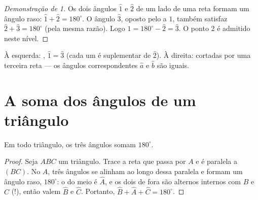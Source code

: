 \begin{proof}[Demonstração de 1]
Os dois ângulos $\widehat{1}$ e $\widehat{2}$ de um lado de uma reta
formam um ângulo raso: $\widehat 1 + \widehat 2 = 180^\circ$. O ângulo
$\widehat 3$, oposto pelo  a $\widehat 1$, também satisfaz
$\widehat 2 + \widehat 3 = 180^\circ$ (pela mesma razão). Logo
$\widehat 1 = 180^\circ - \widehat 2 = \widehat 3$. O ponto 2 é
admitido neste nível.
\end{proof}

\begin{omfigure}

{\small À esquerda: ,
$\widehat 1 = \widehat 3$ (cada um é suplementar de $\widehat 2$). À
direita:  cortadas por uma terceira reta --- os ângulos
correspondentes $\widehat a$ e $\widehat b$ são iguais.}
\end{omfigure}

\section{A soma dos ângulos de um triângulo}

\begin{theorem}\label{thm:g7:triangles:sum}
Em todo triângulo, os três ângulos somam $180^\circ$.
\end{theorem}

\begin{proof}
Seja $ABC$ um triângulo. Trace a reta que passa por $A$ e é paralela a
$(BC)$. No  $A$, três ângulos se alinham ao longo dessa paralela
e formam um ângulo raso, $180^\circ$: o do meio é $\widehat{A}$, e os
dois de fora são alternos internos com $\widehat B$ e $\widehat C$
(!), então valem $\widehat B$ e $\widehat C$. Portanto,
$\widehat B + \widehat A + \widehat C = 180^\circ$.
\end{proof}

